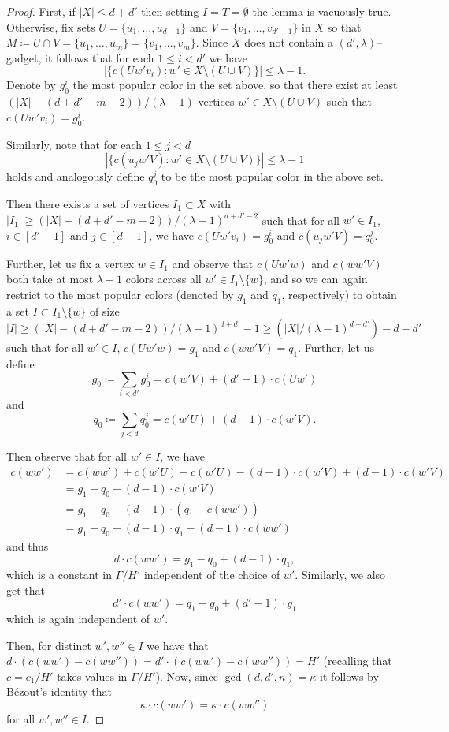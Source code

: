 \documentclass{article}
\theoremstyle{definition}
\begin{document}
\begin{proof}
First, if $|X|\leq d+d'$ then setting $I=T=\emptyset$ the lemma is vacuously true. Otherwise, fix sets $U=\{u_1,\ldots,u_{d-1}\}$ and $V=\{v_1,\ldots,v_{d'-1}\}$ in $X$ so that $M\coloneqq U\cap V =\{u_1,\ldots,u_{m}\}=\{v_1,\ldots,v_{m}\}$. Since $X$ does not contain a $(d', \lambda)$--gadget, it follows that for each $1\leq i<d'$ we have
\[|\{c(Uw'v_i):w'\in X\setminus (U\cup V)\}|\leq \lambda-1.\]
Denote by $g_0^i$ the most popular color in the set above, so that there exist at least $(|X|-(d+d'-m-2))/(\lambda-1)$ vertices $w'\in X\setminus (U\cup V)$ such that $c(Uw'v_i)=g_0^i$.

Similarly, note that for each $1\leq j<d$
\[|\{c(u_jw'V):w'\in X\setminus (U\cup V)\}|\leq \lambda-1\]
holds and analogously define $q_0^j$ to be the most popular color in the above set.

Then there exists a set of vertices $I_1\subset X$ with $|I_1|\geq (|X|-(d+d'-m-2))/(\lambda-1)^{d+d'-2}$ such that for all $w'\in I_1$, $i \in [d'-1]$ and $j \in [d-1]$, we have $c(Uw'v_i)=g_0^i$ and $c(u_jw'V)=q_0^j$. 

Further, let us fix a vertex $w\in I_1$ and observe that $c(Uw'w)$ and $c(ww'V)$ both take at most $\lambda-1$ colors across all $w' \in I_1\setminus \{w\}$, and so we can again restrict to the most popular colors (denoted by $g_1$ and $q_1$, respectively) to obtain a set $I\subset I_1\setminus\{w\}$ of size
\[|I|\geq \left(|X|-(d+d'-m-2)\right)/(\lambda-1)^{d+d'}-1\geq \left(|X|/(\lambda-1)^{d+d'}\right) -d-d'\] 
such that for all $w'\in I$, $c(Uw'w)=g_1$ and $c(ww'V)=q_1$. Further, let us define $$g_0\coloneqq \sum_{i< d'}g_0^i = c(w'V) + (d'-1)\cdot c(Uw')$$ and $$q_0\coloneqq \sum_{j< d} q_0^j = c(w'U) + (d-1)\cdot c(w'V).$$

Then observe that for all $w'\in I$, we have
$$
\begin{aligned}
c(ww')&=c(ww') +c(w'U) - c(w'U) - (d-1)\cdot c(w'V)+(d-1)\cdot c(w'V)\\
&=g_1-q_0+(d-1)\cdot c(w'V)\\
&=g_1-q_0+(d-1)\cdot(q_1-c(ww'))\\
&= g_1-q_0+(d-1)\cdot q_1-(d-1)\cdot c(ww')
\end{aligned}$$
and thus $$d\cdot c(ww')=g_1-q_0+(d-1)\cdot q_1,$$
which is a constant in $\Gamma/H'$ independent of the choice of $w'$. Similarly, we also get that $$d'\cdot c(ww') =q_1-g_0+(d'-1)\cdot g_1$$
which is again independent of $w'$.

Then, for distinct $w',w''\in I$ we have that $d\cdot (c(ww')-c(ww''))=d'\cdot (c(ww')-c(ww''))=H'$ (recalling that $c=c_1/H'$ takes values in $\Gamma/H'$). Now, since $\gcd(d,d',n)=\kappa$ it follows by B\'ezout's identity that \[\kappa\cdot c(ww')=\kappa\cdot c(ww'')\]
for all $w', w''\in I$.


\end{proof}
\end{document}
